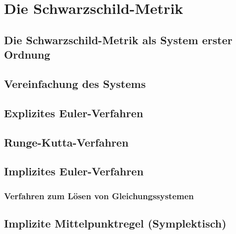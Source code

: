 \documentclass[18px, A4]{article}
\begin{document}
\section{Die Schwarzschild-Metrik}

\subsection{Die Schwarzschild-Metrik als System erster Ordnung}

\subsection{Vereinfachung des Systems}

\subsection{Explizites Euler-Verfahren}

\subsection{Runge-Kutta-Verfahren}

\subsection{Implizites Euler-Verfahren}
\subsubsection{Verfahren zum Lösen von Gleichungssystemen}

\subsection{Implizite Mittelpunktregel (Symplektisch)}
\end{document}
